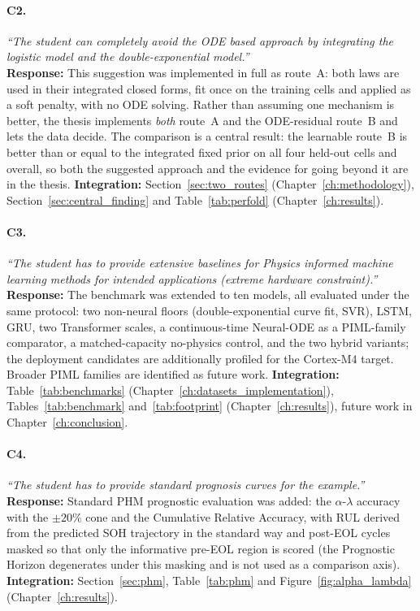 \paragraph{C2.} \emph{``The student can completely avoid the ODE based approach
by integrating the logistic model and the double-exponential model.''}\\
\textbf{Response:} This suggestion was implemented in full as route~A: both
laws are used in their integrated closed forms, fit once on the training cells
and applied as a soft penalty, with no ODE solving. Rather than assuming one
mechanism is better, the thesis implements \emph{both} route~A and the
ODE-residual route~B and lets the data decide. The comparison is a central
result: the learnable route~B is better than or equal to the integrated fixed
prior on all four held-out cells and overall, so both the suggested approach
and the evidence for going beyond it are in the thesis.
\textbf{Integration:} Section~\ref{sec:two_routes}
(Chapter~\ref{ch:methodology}), Section~\ref{sec:central_finding} and
Table~\ref{tab:perfold} (Chapter~\ref{ch:results}).

\paragraph{C3.} \emph{``The student has to provide extensive baselines for
Physics informed machine learning methods for intended applications (extreme
hardware constraint).''}\\
\textbf{Response:} The benchmark was extended to ten models, all evaluated
under the same protocol: two non-neural floors (double-exponential curve fit,
SVR), LSTM, GRU, two Transformer scales, a continuous-time Neural-ODE as a
PIML-family comparator, a matched-capacity no-physics control, and the two
hybrid variants; the deployment candidates are additionally profiled for the
Cortex-M4 target. Broader PIML families are identified as future work.
\textbf{Integration:} Table~\ref{tab:benchmarks}
(Chapter~\ref{ch:datasets_implementation}), Tables~\ref{tab:benchmark}
and~\ref{tab:footprint} (Chapter~\ref{ch:results}), future work in
Chapter~\ref{ch:conclusion}.

\paragraph{C4.} \emph{``The student has to provide standard prognosis curves
for the example.''}\\
\textbf{Response:} Standard PHM prognostic evaluation was added: the
$\alpha$-$\lambda$ accuracy with the $\pm20\%$ cone and the Cumulative
Relative Accuracy, with RUL derived from the predicted SOH trajectory in the
standard way and post-EOL cycles masked so that only the informative pre-EOL
region is scored (the Prognostic Horizon degenerates under this masking and is
not used as a comparison axis).
\textbf{Integration:} Section~\ref{sec:phm}, Table~\ref{tab:phm} and
Figure~\ref{fig:alpha_lambda} (Chapter~\ref{ch:results}).

